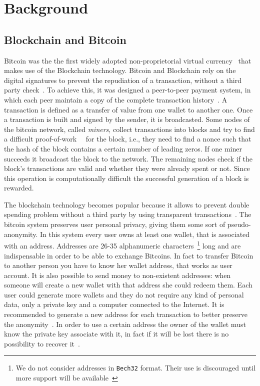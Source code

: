 \section{Background}
\subsection{Blockchain and Bitcoin}
Bitcoin was the the first widely adopted non-proprietorial virtual
currency~\cite{bib:respCrypto} that makes use of the
Blockchain technology. Bitcoin and Blockchain rely on the digital
signatures to prevent the repudiation of a transaction, without a third
party check~\cite{bib:anonAnalysis}.
To achieve this, it was designed a peer-to-peer payment system,
in which each peer maintain a copy of the complete transaction
history~\cite{bib:fistful}. A transaction is defined as a transfer of value
from one wallet to another one. Once a transaction is built and signed by the
sender, it is broadcasted. Some nodes of the bitcoin network, called
\textit{miners}, collect transactions into blocks and try to find a difficult
proof-of-work~\cite{bib:pricing}~\cite{bib:hashcash} for the block, i.e., they
need to find a nonce such that the hash of the block contains a certain number
of leading zeros. If one miner succeeds it broadcast the block to the network.
The remaining nodes check if the block's transactions are valid and whether
they were already spent or not. Since this operation is computationally
difficult the successful generation of a block is rewarded.~\cite{bib:satoshi}

The blockchain technology becomes popular because it allows
to prevent double spending problem without a third party by using
transparent transactions~\cite{bib:bitcoinbeyond}.
The bitcoin system preserves user personal privacy, giving them some
sort of pseudo-anonymity.
In this system every user owns at least one wallet, that is associated
with an address. Addresses are 26-35 alphanumeric
characters~\cite{bib:bitcoinwiki:address}\footnote{We do not consider addresses
in \texttt{Bech32} format. Their use is discouraged until more support will be
available~\cite{bib:bitcoinwiki:bech32}} long and
are indispensable in order to be able to exchange Bitcoins.
In fact to transfer Bitcoin to another person you have to know her
wallet address, that works as user account.
It is also possible to send money to non-existent addresses: when
someone will create a new wallet with that address she could redeem
them. Each user could generate more wallets and they do not require any kind
of personal data, only a private key and a computer connected to the Internet.
It is recommended to generate a new address for each transaction
to better preserve the anonymity~\cite{bib:satoshi}.
In order to use a certain address the owner of the wallet must know
the private key associate with it, in fact if it
will be lost there is no possibility to recover it~\cite{bib:respCrypto}.


